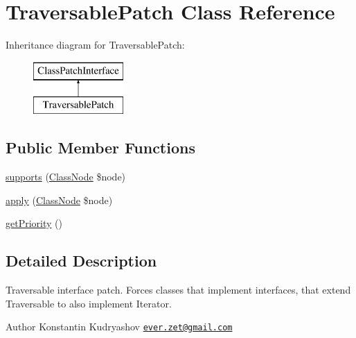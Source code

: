 \hypertarget{class_prophecy_1_1_doubler_1_1_class_patch_1_1_traversable_patch}{}\section{Traversable\+Patch Class Reference}
\label{class_prophecy_1_1_doubler_1_1_class_patch_1_1_traversable_patch}
Inheritance diagram for Traversable\+Patch\+:\begin{figure}[H]
\begin{center}
\leavevmode
\includegraphics[height=2.000000cm]{class_prophecy_1_1_doubler_1_1_class_patch_1_1_traversable_patch}
\end{center}
\end{figure}
\subsection*{Public Member Functions}
\begin{DoxyCompactItemize}
\item 
\mbox{\hyperlink{class_prophecy_1_1_doubler_1_1_class_patch_1_1_traversable_patch_a99b2455ac194faf79aff042c55719ac2}{supports}} (\mbox{\hyperlink{class_prophecy_1_1_doubler_1_1_generator_1_1_node_1_1_class_node}{Class\+Node}} \$node)
\item 
\mbox{\hyperlink{class_prophecy_1_1_doubler_1_1_class_patch_1_1_traversable_patch_a62fdb697928f35fc782d6889b8fe9b8b}{apply}} (\mbox{\hyperlink{class_prophecy_1_1_doubler_1_1_generator_1_1_node_1_1_class_node}{Class\+Node}} \$node)
\item 
\mbox{\hyperlink{class_prophecy_1_1_doubler_1_1_class_patch_1_1_traversable_patch_a1e7a3c168dcd0901a0d2669c67575b55}{get\+Priority}} ()
\end{DoxyCompactItemize}


\subsection{Detailed Description}
Traversable interface patch. Forces classes that implement interfaces, that extend Traversable to also implement Iterator.

\begin{DoxyAuthor}{Author}
Konstantin Kudryashov \href{mailto:ever.zet@gmail.com}{\tt ever.\+zet@gmail.\+com} 
\end{DoxyAuthor}


